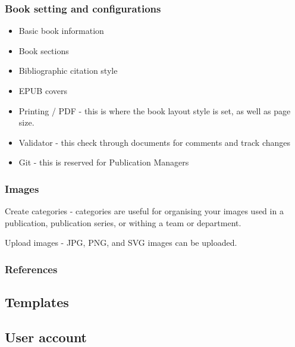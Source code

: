 \documentclass{article}
\begin{document}
\subsubsection{Book setting and configurations}\label{H3989750}


\begin{itemize}
\item Basic book information


\item Book sections


\item Bibliographic citation style


\item EPUB covers


\item Printing / PDF - this is where the book layout style is set, as well as page size.


\item Validator - this check through documents for comments and track changes


\item Git - this is reserved for Publication Managers 


\end{itemize}

\subsubsection{Images}\label{H9336653}



Create categories - categories are useful for organising your images used in a publication, publication series, or withing a team or department.


Upload images - JPG, PNG, and SVG images can be uploaded.


\subsubsection{References}\label{H6668129}






\subsection{Templates}\label{H7350400}






\subsection{User account}\label{H8460509}
\end{document}

